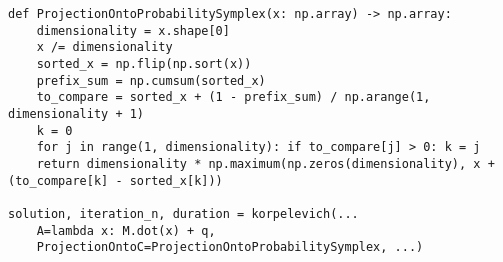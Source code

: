 \begin{verbatim}
def ProjectionOntoProbabilitySymplex(x: np.array) -> np.array:
    dimensionality = x.shape[0]
    x /= dimensionality
    sorted_x = np.flip(np.sort(x))
    prefix_sum = np.cumsum(sorted_x)
    to_compare = sorted_x + (1 - prefix_sum) / np.arange(1, dimensionality + 1)
    k = 0
    for j in range(1, dimensionality): if to_compare[j] > 0: k = j
    return dimensionality * np.maximum(np.zeros(dimensionality), x + (to_compare[k] - sorted_x[k]))

solution, iteration_n, duration = korpelevich(...
    A=lambda x: M.dot(x) + q,
    ProjectionOntoC=ProjectionOntoProbabilitySymplex, ...)
\end{verbatim}